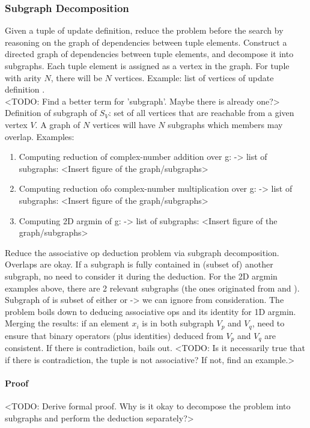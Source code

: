 \subsubsection{Subgraph Decomposition}

Given a tuple of update definition, reduce the problem before the search by reasoning on the graph of dependencies between tuple elements. Construct a directed graph of dependencies between tuple elements, and decompose it into subgraphs. Each tuple element is assigned as a vertex in the graph. For tuple with arity $N$, there will be $N$ vertices. Example: list of vertices of update definition . \\

<TODO: Find a better term for 'subgraph'. Maybe there is already one?> \\

Definition of subgraph of $S_V$: set of all vertices that are reachable from a given vertex $V$. A graph of $N$ vertices will have $N$ subgraphs which members may overlap. Examples: 
\begin{enumerate}
 \item Computing reduction of complex-number addition over g:  -> list of subgraphs:  <Insert figure of the graph/subgraphs>
 \item Computing reduction ofo complex-number multiplication over g:  -> list of subgraphs:  <Insert figure of the graph/subgraphs>
 \item Computing 2D argmin of g:  -> list of subgraphs:  <Insert figure of the graph/subgraphs>
\end{enumerate}

Reduce the associative op deduction problem via subgraph decomposition. Overlaps are okay. If a subgraph is fully contained in (subset of) another subgraph, no need to consider it during the deduction. For the 2D argmin examples above, there are 2 relevant subgraphs (the ones originated from  and ). Subgraph of  is subset of either  or  -> we can ignore  from consideration. The problem boils down to deducing associative ops and its identity for 1D argmin. Merging the results: if an element $x_i$ is in both subgraph $V_p$ and $V_q$, need to ensure that binary operators (plus identities) deduced from $V_p$ and $V_q$ are consistent. If there is contradiction, bails out. <TODO: Is it necessarily true that if there is contradiction, the tuple is not associative? If not, find an example.> \\

\paragraph{Proof}
<TODO: Derive formal proof. Why is it okay to decompose the problem into subgraphs and perform the deduction separately?> \\


